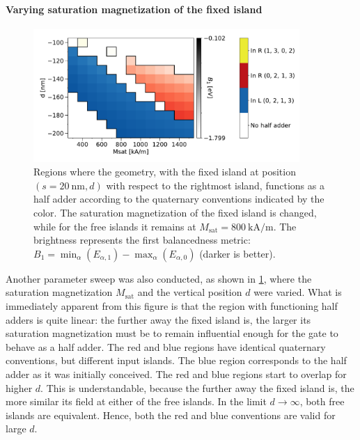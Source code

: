 \documentclass[11pt,a4paper,english]{article}
\begin{document}
\paragraph{Varying saturation magnetization of the fixed island}
\begin{figure}[b!]
    \centering
    \includegraphics[width=0.9\textwidth]{Figures/half_adder/sweep/000006_d-Msat/table(d100-200_10,Msat3e5-15e5_1e5)_balanced1.pdf}
    \caption{Regions where the geometry, with the fixed island at position $(s=\SI{20}{\nano\metre}, d)$ with respect to the rightmost island, functions as a half adder according to the quaternary conventions indicated by the color. The saturation magnetization of the fixed island is changed, while for the free islands it remains at $M_\mathrm{sat} = \SI{800}{\kilo\ampere\per\metre}$. The brightness represents the first balancedness metric: $B_1 = \min_\alpha(E_{\alpha,1}) - \max_\alpha(E_{\alpha,0})$ (darker is better).} 
    \label{fig:HalfAdder_000006_sweep_d-Msat_balanced1}
\end{figure}
Another parameter sweep was also conducted, as shown in \cref{fig:HalfAdder_000006_sweep_d-Msat_balanced1}, where the saturation magnetization $M_\mathrm{sat}$ and the vertical position $d$ were varied. What is immediately apparent from this figure is that the region with functioning half adders is quite linear: the further away the fixed island is, the larger its saturation magnetization must be to remain influential enough for the gate to behave as a half adder. The red and blue regions have identical quaternary conventions, but different input islands. The blue region corresponds to the half adder as it was initially conceived. The red and blue regions start to overlap for higher $d$. This is understandable, because the further away the fixed island is, the more similar its field at either of the free islands. In the limit $d\rightarrow\infty$, both free islands are equivalent. Hence, both the red and blue conventions are valid for large $d$. \par
\end{document}

